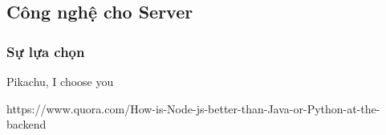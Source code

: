 \subsection{Công nghệ cho Server}



\subsubsection{Sự lựa chọn}
Pikachu, I choose you

https://www.quora.com/How-is-Node-js-better-than-Java-or-Python-at-the-backend